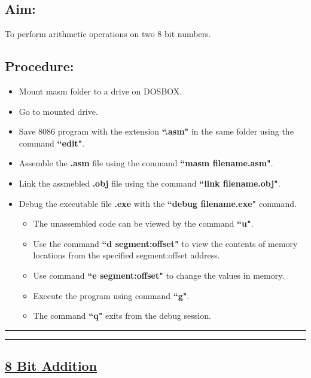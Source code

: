 \documentclass[12pt,a4paper]{article}
\begin{document}
\begin{flushleft}
\subsection*{\textbf{Aim:}} 
To perform arithmetic operations on two 8 bit numbers.

\subsection*{\textbf{Procedure:}}
\begin{itemize}
    \item Mount masm folder to a drive on DOSBOX.
    \item Go to mounted drive.
    \item Save 8086 program with the extension \textbf{``.asm"} in the same folder using the command \textbf{``edit"}.
    \item Assemble the \textbf{.asm} file using the command \textbf{``masm filename.asm"}.
    \item Link the assmebled \textbf{.obj} file using the command \textbf{``link filename.obj"}.
    \item Debug the executable file \textbf{.exe} with the \textbf{``debug filename.exe"} command.
    \begin{itemize}
        \item The unassembled code can be viewed by the command \textbf{``u"}.
        \item Use the command \textbf{``d segment:offset"} to view the contents of memory locations from the specified segment:offset address.
        \item Use command \textbf{``e segment:offset"} to change the values in memory.
        \item Execute the program using command \textbf{``g"}.
        \item The command \textbf{``q"} exits from the debug session.
    \end{itemize}
\end{itemize}

\noindent\rule{\textwidth}{1.5pt}
\hrule
\newpage
\subsection*{\textbf{\underline{8 Bit Addition}}}


\end{flushleft}
\end{document}
